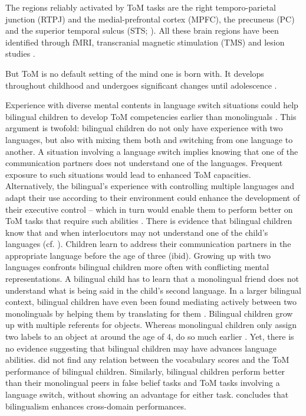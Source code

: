 \documentclass[output=paper]{LSP/langsci}
\begin{document}
The regions reliably activated by ToM tasks are the right temporo-parietal junction (RTPJ) and the medial-prefrontal cortex (MPFC), the precuneus (PC) and the superior temporal sulcus (STS; \citealt{KosterHale2013, DodellFeder2011, Saxe2010, Young2010, Atique2010, Saxe2009}). All these brain regions have been identified through fMRI, transcranial magnetic stimulation (TMS) and lesion studies \citep{Saxe2009}.


But ToM is no default setting of the mind one is born with. It develops throughout childhood and undergoes significant changes until adolescence \citep{Gunther2012, Cummings2009}. 


Experience with diverse mental contents in language switch situations could help bilingual children to develop ToM competencies earlier than monolinguals \citep{Kovacs2009}. This argument is twofold: bilingual children do not only have experience with two languages, but also with mixing them both and switching from one language to another. A situation involving a language switch implies knowing that one of the communication partners does not understand one of the languages. Frequent exposure to such situations would lead to enhanced ToM capacities. Alternatively, the bilingual's experience with controlling multiple languages and adapt their use according to their environment could enhance the development of their executive control -- which in turn would enable them to perform better on ToM tasks that require such abilities \citep{Kovacs2009}. There is evidence that bilingual children know that and when interlocutors may not understand one of the child's languages (cf. \citealt{Bassnett2002}). Children learn to address their communication partners in the appropriate language before the age of three (ibid). Growing up with two languages confronts bilingual children more often with conflicting mental representations. A bilingual child has to learn that a monolingual friend does not understand what is being said in the child's second language. In a larger bilingual context, bilingual children have even been found mediating actively between two monolinguals by helping them by translating for them \citep{Kovacs2009}. Bilingual children grow up with multiple referents for objects. Whereas monolingual children only assign two labels to an object at around the age of 4,  do so much earlier \citep{Kovacs2009}. Yet, there is no evidence suggesting that bilingual children may have advances language abilities. \citet{Kovacs2009} did not find any relation between the vocabulary scores and the ToM performance of bilingual children. Similarly, bilingual children perform better than their monolingual peers in false belief tasks and ToM tasks involving a language switch, without showing an advantage for either task. \citet{Kovacs2009} concludes that bilingualism enhances cross-domain performances. 
\end{document}
